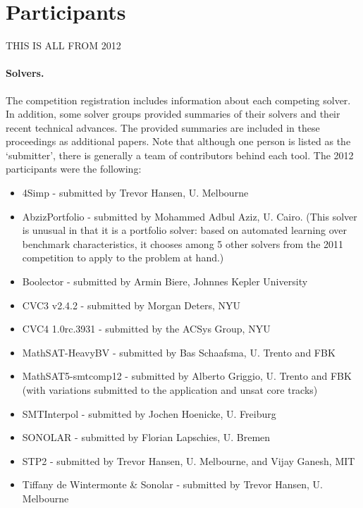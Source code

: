 \documentclass[twosize,11pt]{article}
\begin{document}
\section{Participants}
\label{sec:participants}

THIS IS ALL FROM 2012

\paragraph{Solvers.} The competition registration includes information about each competing solver. In addition, some solver groups provided summaries of their solvers and their recent technical advances. The provided summaries are included in these proceedings as additional papers. Note that although one person is listed as the `submitter', there is generally a team of contributors behind each tool. The 2012 participants were the following:
\begin{itemize}
\item 4Simp - submitted by Trevor Hansen, U. Melbourne
\item AbzizPortfolio - submitted by Mohammed Adbul Aziz, U. Cairo. (This solver is unusual in that it is a portfolio solver: based on automated learning over benchmark characteristics, it chooses among 5 other solvers from the 2011 competition to apply to the problem at hand.)
\item Boolector - submitted by Armin Biere, Johnnes Kepler University
\item CVC3 v2.4.2 - submitted by Morgan Deters, NYU
\item CVC4 1.0rc.3931 - submitted by the ACSys Group, NYU
\item MathSAT-HeavyBV - submitted by Bas Schaafsma, U. Trento and FBK
\item MathSAT5-smtcomp12 - submitted by Alberto Griggio, U. Trento and FBK (with variations submitted to the application and unsat core tracks)
\item SMTInterpol - submitted by Jochen Hoenicke, U. Freiburg
\item SONOLAR - submitted by Florian Lapschies, U. Bremen
\item STP2 - submitted by Trevor Hansen, U. Melbourne, and Vijay Ganesh, MIT
\item Tiffany de Wintermonte \& Sonolar - submitted by Trevor Hansen, U. Melbourne
\end{itemize}
\end{document}
